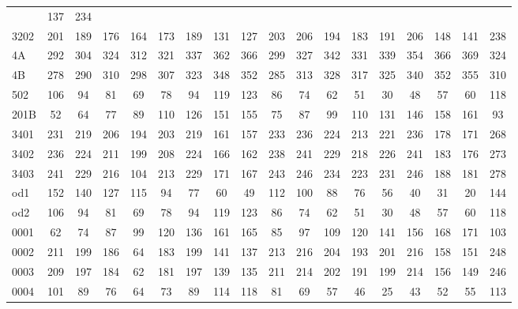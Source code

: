 \begin{table}[htbp]
\begin{center}
{\begin{tabular}{lccccccccccccccccc}
							       & 137 &
								       234 \\
3202 & 201 & 189 & 176 & 164 & 173 & 189 & 131 & 127 & 203 & 206 & 194 &
						   183 & 191 & 206 & 148
							       & 141 &
								       238 \\
4A & 292 & 304 & 324 & 312 & 321 & 337 & 362 & 366 & 299 & 327 & 342 &
						   331 & 339 & 354 & 366
							       & 369 &
								       324 \\
4B & 278 & 290 & 310 & 298 & 307 & 323 & 348 & 352 & 285 & 313 & 328 &
						   317 & 325 & 340 & 352
							       & 355 &
								       310 \\
502 & 106 & 94 & 81 & 69 & 78 & 94 & 119 & 123 & 86 & 74 & 62 & 51 & 30
						       & 48 & 57 & 60 &
								       118 \\
201B & 52 & 64 & 77 & 89 & 110 & 126 & 151 & 155 & 75 & 87 & 99 & 110 &
						       131 & 146 & 158 &
								   161 &
								       93 \\
3401 & 231 & 219 & 206 & 194 & 203 & 219 & 161 & 157 & 233 & 236 & 224 &
						   213 & 221 & 236 & 178
							       & 171 &
								       268 \\
3402 & 236 & 224 & 211 & 199 & 208 & 224 & 166 & 162 & 238 & 241 & 229 &
						   218 & 226 & 241 & 183
							       & 176 &
								       273 \\
3403 & 241 & 229 & 216 & 104 & 213 & 229 & 171 & 167 & 243 & 246 & 234 &
						   223 & 231 & 246 & 188
							       & 181 &
								       278 \\
od1 & 152 & 140 & 127 & 115 & 94 & 77 & 60 & 49 & 112 & 100 & 88 & 76 &
						       56 & 40 & 31 & 20
								   & 144 \\
od2 & 106 & 94 & 81 & 69 & 78 & 94 & 119 & 123 & 86 & 74 & 62 & 51 & 30
						       & 48 & 57 & 60 &
								       118 \\
0001 & 62 & 74 & 87 & 99 & 120 & 136 & 161 & 165 & 85 & 97 & 109 & 120 &
						       141 & 156 & 168 &
								   171 &
								       103 \\
0002 & 211 & 199 & 186 & 64 & 183 & 199 & 141 & 137 & 213 & 216 & 204 &
						   193 & 201 & 216 & 158
							       & 151 &
								       248 \\
0003 & 209 & 197 & 184 & 62 & 181 & 197 & 139 & 135 & 211 & 214 & 202 &
						   191 & 199 & 214 & 156
							       & 149 &
								       246 \\
0004 & 101 & 89 & 76 & 64 & 73 & 89 & 114 & 118 & 81 & 69 & 57 & 46 & 25
						       & 43 & 52 & 55 &
								       113 \\

\end{tabular}}
\end{center}
\end{table}
